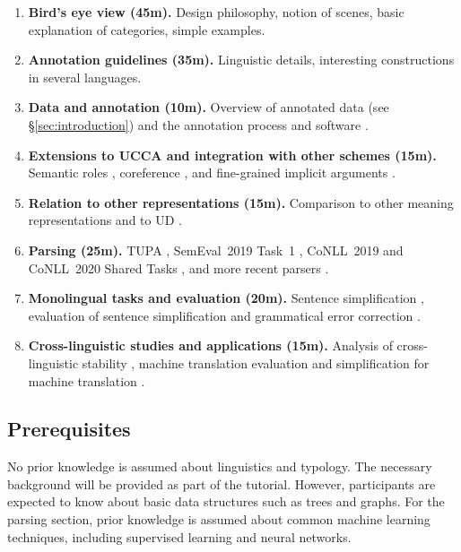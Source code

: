 \documentclass[11pt,a4paper,table]{article}
\begin{document}
\begin{enumerate}
    \item \textbf{Bird's eye view (45m).}
    Design philosophy, notion of scenes, basic explanation of categories, simple examples.
    \item \textbf{Annotation guidelines (35m).}
    Linguistic details, interesting constructions
    in several languages.
    \item \textbf{Data and annotation (10m).}
    Overview of annotated data (see \S\ref{sec:introduction})
    and the annotation process and software \cite{abend2017uccaapp}.
    \item \textbf{Extensions to UCCA and integration with other schemes (15m).}
    Semantic roles \cite{prange2019made},
    coreference \cite{prange2019semantically}, and
    fine-grained implicit arguments \cite{cui-hershcovich-2020-refining}.
    \item \textbf{Relation to other representations (15m).}
    Comparison to other meaning representations
    \cite{abend2017state,koller2019graph,hershcovich-et-al-2020-comparison}
    and to UD \cite{hershcovich2019content}.
    \item \textbf{Parsing (25m).}
    TUPA \cite{hershcovich2017a,hershcovich2018multitask,Her:Arv:19,Arv:Cui:Her:20},
    SemEval~2019 Task~1 \cite{hershcovich2019shared,jiang-19},
    CoNLL~2019 and CoNLL~2020 Shared Tasks \cite{Oep:Abe:Haj:19,Oep:Abe:Abz:20}, and
    more recent parsers \cite{zhang2019broad}.
    \item \textbf{Monolingual tasks and evaluation (20m).}
    Sentence simplification \cite{sulem-etal-2018-simple},
    evaluation of sentence simplification \cite{sulem-etal-2018-semantic,alvamanchego-etal:2019:easse}
    and grammatical error correction \cite{choshen-abend-2018-automatic}.
    \item \textbf{Cross-linguistic studies and applications (15m).}
    Analysis of cross-linguistic stability \cite{sulem2015conceptual},
    machine translation evaluation \cite{birch-etal-2016-hume,marecek-etal-2017-cuni,xu2020incorporate}
    and simplification for machine translation \cite{sulem-etal-2020-semantic}.
\end{enumerate}

\subsection{Prerequisites}\label{sec:prerequisites}

No prior knowledge is assumed about linguistics and typology.
The necessary background will be provided as part of the tutorial.
However, participants are expected to know about basic data structures
such as trees and graphs.
For the parsing section, prior knowledge is assumed about
common machine learning techniques, including supervised learning
and neural networks.
\end{document}
